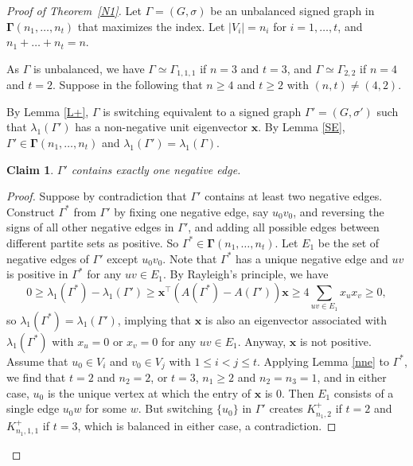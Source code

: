 \documentclass[12pt]{article}
\numberwithin{equation}{section}
\newtheorem {Claim} {Claim}[section]
\begin{document}
\begin{proof}[Proof of Theorem~\ref{N1}]
Let $\Gamma=(G,\sigma)$ be an unbalanced signed graph in $\boldsymbol\Gamma(n_1,\dots, n_t)$ that maximizes the index. 
Let $|V_i|=n_i$ for $i=1, \dots, t$, and $n_1+\dots+n_t=n$. 

As $\Gamma$ is unbalanced, we have $\Gamma\simeq \Gamma_{1,1,1}$ if $n=3$ and $t=3$, and $\Gamma\simeq \Gamma_{2,2}$ if $n=4$ and $t=2$. 
Suppose in the following that $n\ge 4$ and $t\ge 2$ with $(n,t)\ne (4,2)$. 

By Lemma \ref{L+},  $\Gamma$ is switching equivalent to
a signed graph $\Gamma'=(G,\sigma')$  such that $\lambda_1(\Gamma')$ has a non-negative unit eigenvector $\mathbf{x}$. 
By Lemma \ref{SE}, $\Gamma'\in \boldsymbol\Gamma(n_1,\dots, n_t)$ and $\lambda_1(\Gamma')=\lambda_1(\Gamma)$. 

\begin{Claim}\label{onene}
$\Gamma'$ contains exactly one negative edge. 
\end{Claim}

\begin{proof}
Suppose by contradiction  that $\Gamma'$ contains at least two negative edges. 
Construct $\Gamma^*$ from $\Gamma'$ by fixing one negative edge, say $u_0v_0$, and reversing the signs of all other negative edges in $\Gamma'$, and adding all possible edges between different partite sets as positive. So $\Gamma^*\in \boldsymbol\Gamma (n_1,\dots, n_t)$. Let $E_1$ be the set of negative edges of $\Gamma'$ except $u_0v_0$. %
Note that $\Gamma^*$ has a unique negative edge and $uv$ is positive in $\Gamma^*$ for any $uv\in E_1$. 
By Rayleigh's principle, we have
\[
0\ge \lambda_1(\Gamma^*)-\lambda_1(\Gamma')\ge \mathbf{x}^\top\left(A(\Gamma^*)-A(\Gamma')\right)\mathbf{x}\ge 4\sum_{uv\in E_1}x_{u}x_{v}\ge 0, 
\]
so $\lambda_1(\Gamma^*)=\lambda_1(\Gamma')$, implying that $\mathbf{x}$ is also an eigenvector associated with $\lambda_1(\Gamma^*)$ with  $x_{u}=0$ or $x_{v}=0$ for any $uv\in E_1$. Anyway, $\mathbf{x}$ is not positive.
Assume that $u_0\in V_i$ and $v_0\in V_j$ with $1\le i<j\le t$. 
Applying Lemma \ref{nne} to $\Gamma^*$, we find that  $t=2$ and $n_2=2$, 
or $t=3$, $n_1\ge 2$ and $n_2=n_3=1$, and in either case, $u_0$ is the unique vertex at which the entry of $\mathbf{x}$ is $0$. Then $E_1$ consists of a single edge $u_0w$ for some $w$. But  switching $\{u_0\}$ in $\Gamma'$ creates  $K_{n_1,2}^+$ if $t=2$ and $K_{n_1,1,1}^+$ if $t=3$, which is balanced in either case, a contradiction. 
\end{proof}




\end{proof}
\end{document}
